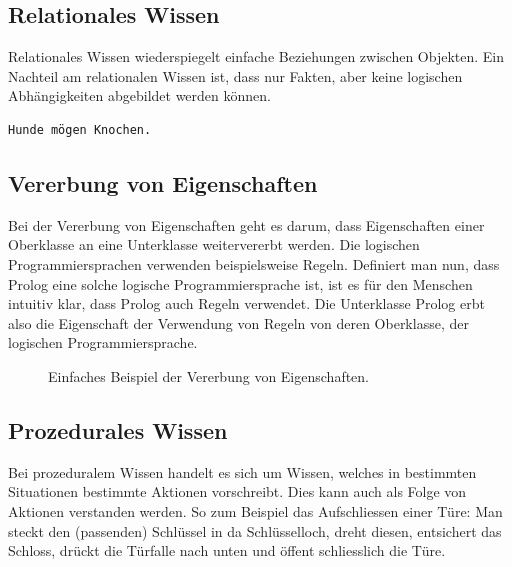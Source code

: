 \subsection{Relationales Wissen}
\label{subsec:relationales_wissen}
Relationales Wissen wiederspiegelt einfache Beziehungen zwischen Objekten. Ein Nachteil am relationalen Wissen ist, dass nur Fakten, aber keine logischen Abhängigkeiten abgebildet werden können.

\begin{lstlisting}[caption={Einfaches Beispiel von relationalem Wissen.}]
    Hunde mögen Knochen.
\end{lstlisting}

\newpage

\subsection{Vererbung von Eigenschaften}
\label{subsec:vererbung_eigenschaft}
Bei der Vererbung von Eigenschaften geht es darum, dass Eigenschaften einer Oberklasse an eine Unterklasse weitervererbt werden. Die logischen Programmiersprachen verwenden beispielsweise Regeln. Definiert man nun, dass Prolog eine solche logische Programmiersprache ist, ist es für den Menschen intuitiv klar, dass Prolog auch Regeln verwendet. Die Unterklasse Prolog erbt also die Eigenschaft der Verwendung von Regeln von deren Oberklasse, der logischen Programmiersprache.

\begin{figure}[htbp]
\centering {}
\caption{Einfaches Beispiel der Vererbung von Eigenschaften.\label{fig:experten_systeme_vererbung}\protect\footnotemark}
\end{figure}

\subsection{Prozedurales Wissen}
\label{subsec:prozedurales_wissen}
Bei prozeduralem Wissen handelt es sich um Wissen, welches in bestimmten Situationen bestimmte Aktionen vorschreibt. Dies kann auch als Folge von Aktionen verstanden werden. So zum Beispiel das Aufschliessen einer Türe: Man steckt den (passenden) Schlüssel in da Schlüsselloch, dreht diesen, entsichert das Schloss, drückt die Türfalle nach unten und öffent schliesslich die Türe.

